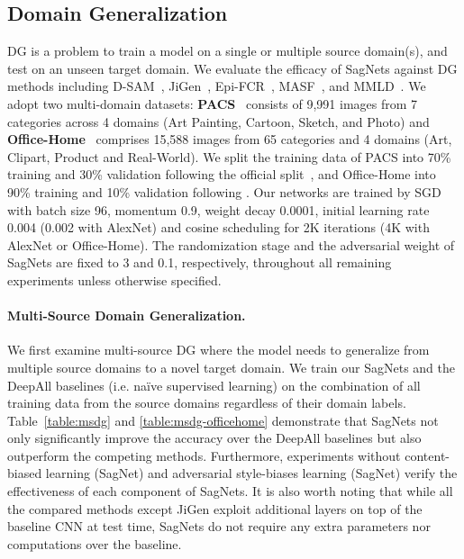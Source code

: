 \subsection{Domain Generalization}
\label{sec:exp-dg}
DG is a problem to train a model on a single or multiple source domain(s), and test on an unseen target domain.
We evaluate the efficacy of SagNets against  DG methods including D-SAM~\cite{innocente2018domain}, JiGen~\cite{carlucci2019domain}, Epi-FCR~\cite{li2019episodic}, MASF~\cite{dou2019domain}, and MMLD~\cite{matsuura2020domain}. 
We adopt two multi-domain datasets: \textbf{PACS}~\cite{li2017deeper} consists of 9,991 images from 7 categories across 4 domains (Art Painting, Cartoon, Sketch, and Photo) and \textbf{Office-Home}~\cite{venkateswara2017deep} comprises 15,588 images from 65 categories and 4 domains (Art, Clipart, Product and Real-World).
We split the training data of PACS into 70\% training and 30\% validation following the official split~\cite{li2017deeper}, and Office-Home into 90\% training and 10\% validation following \cite{innocente2018domain}.
Our networks are trained by SGD with batch size 96, momentum 0.9, weight decay 0.0001, initial learning rate 0.004 (0.002 with AlexNet) and cosine scheduling for 2K iterations (4K with AlexNet or Office-Home).
The randomization stage and the adversarial weight of SagNets are fixed to 3 and 0.1, respectively, throughout all remaining experiments unless otherwise specified.


\paragraph{\textnormal{\textbf{Multi-Source Domain Generalization.}}}
We first examine multi-source DG where the model needs to generalize from multiple source domains to a novel target domain. 
We train our SagNets and the DeepAll baselines (i.e. na\"ive supervised learning) on the combination of all training data from the source domains regardless of their domain labels.
Table~\ref{table:msdg} and \ref{table:msdg-officehome} demonstrate that SagNets not only significantly improve the accuracy over the DeepAll baselines but also outperform the competing methods.
Furthermore, experiments without content-biased learning (SagNet) and adversarial style-biases learning (SagNet) verify the effectiveness of each component of SagNets.
It is also worth noting that while all the compared methods except JiGen exploit additional layers on top of the baseline CNN at test time, SagNets do not require any extra parameters nor computations over the baseline. 


